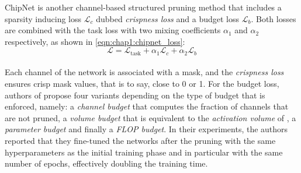 ChipNet \cite{tiwari2021chipnet} is another channel-based structured pruning
method that includes a sparsity inducing loss $\mathcal{L}_c$ dubbed
\emph{crispness loss} and a budget loss $\mathcal{L}_b$. Both losses are
combined with the task loss with two mixing coefficients $\alpha_1$ and
$\alpha_2$ respectively, as shown in \cref{eqn:chap1:chipnet_loss}:\\

\begin{equation}
  \label{eqn:chap1:chipnet_loss}
  \mathcal{L} = \mathcal{L}_{\text{task}} + \alpha_1 \mathcal{L}_c + \alpha_2 \mathcal{L}_b
\end{equation}\\




Each channel of the network is associated with a mask, and the \emph{crispness
loss} ensures crisp mask values, that is to say, close to 0 or 1. For the
budget loss, authors of \cite{tiwari2021chipnet} propose four variants depending
on the type of budget that is enforced, namely: a \emph{channel budget} that
computes the fraction of channels that are not pruned, a \emph{volume budget}
that is equivalent to the \emph{activation volume} of
\cite{lemaire2019structured}, a \emph{parameter budget} and finally a
\emph{\ac{FLOP} budget}. In their experiments, the authors reported that they
fine-tuned the networks after the pruning with the same hyperparameters as the
initial training phase and in particular with the same number of epochs,
effectively doubling the training time.\\

